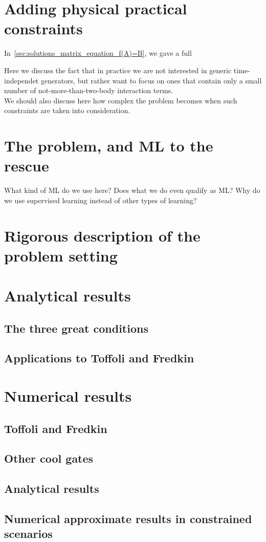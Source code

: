 \section{Adding physical practical constraints}
\label{sec:constraints_on_interaction_pars}

In~\cref{sec:solutions_matrix_equation_f(A)=B}, we gave a full 

Here we discuss the fact that in practice we are not interested in generic time-independet generators, but rather want to focus on ones that contain only a small number of not-more-than-two-body interaction terms.
\\[2ex]
We should also discuss here how complex the problem becomes when such constraints are taken into consideration.

\section{The problem, and ML to the rescue}

What kind of ML do we use here? Does what we do even qualify as ML? Why do we use supervised learning instead of other types of learning?



\section{Rigorous description of the problem setting}

\section{Analytical results}

\subsection{The three great conditions}

\subsection{Applications to Toffoli and Fredkin}

\section{Numerical results}

\subsection{Toffoli and Fredkin}

\subsection{Other cool gates}

\subsection{Analytical results}

\subsection{Numerical approximate results in constrained scenarios}

